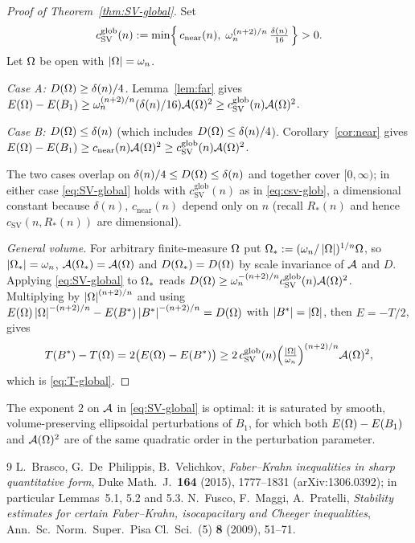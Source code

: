 \begin{proof}[Proof of Theorem~\ref{thm:SV-global}]
Set
\begin{equation}\label{eq:csv-glob}
   c_{\mathrm{SV}}^{\mathrm{glob}}(n)
   :=\min\Bigl\{\,c_{\mathrm{near}}(n),\;
   \omega_n^{(n+2)/n}\,\tfrac{\delta(n)}{16}\,\Bigr\}>0 .
\end{equation}
Let $\Omega$ be open with $\left|\Omega\right|=\omega_n$.

\emph{Case A: $D(\Omega)\ge\delta(n)/4$.} Lemma~\ref{lem:far} gives
$E(\Omega)-E(B_1)\ge\omega_n^{(n+2)/n}(\delta(n)/16)\mathcal{A}(\Omega)^2
\ge c_{\mathrm{SV}}^{\mathrm{glob}}(n)\mathcal{A}(\Omega)^2$.

\emph{Case B: $D(\Omega)\le\delta(n)$} (which includes
$D(\Omega)\le\delta(n)/4$). Corollary~\ref{cor:near} gives
$E(\Omega)-E(B_1)\ge c_{\mathrm{near}}(n)\mathcal{A}(\Omega)^2
\ge c_{\mathrm{SV}}^{\mathrm{glob}}(n)\mathcal{A}(\Omega)^2$.

The two cases overlap on $\delta(n)/4\le D(\Omega)\le\delta(n)$ and together
cover $[0,\infty)$; in either case \eqref{eq:SV-global} holds with
$c_{\mathrm{SV}}^{\mathrm{glob}}(n)$ as in \eqref{eq:csv-glob}, a
dimensional constant because $\delta(n)$, $c_{\mathrm{near}}(n)$ depend
only on $n$ (recall $R_*(n)$ and hence $c_{\mathrm{SV}}(n,R_*(n))$ are
dimensional).

\emph{General volume.} For arbitrary finite-measure $\Omega$ put
$\Omega_*:=(\omega_n/\left|\Omega\right|)^{1/n}\Omega$, so $\left|\Omega_*\right|=\omega_n$,
$\mathcal{A}(\Omega_*)=\mathcal{A}(\Omega)$ and $D(\Omega_*)=D(\Omega)$ by scale invariance of
$\mathcal{A}$ and $D$. Applying \eqref{eq:SV-global} to $\Omega_*$ reads
$D(\Omega)\ge\omega_n^{-(n+2)/n}c_{\mathrm{SV}}^{\mathrm{glob}}(n)\mathcal{A}(\Omega)^2$.
Multiplying by $\left|\Omega\right|^{(n+2)/n}$ and using
$E(\Omega)\left|\Omega\right|^{-(n+2)/n}-E(B^*)\left|B^*\right|^{-(n+2)/n}=D(\Omega)$ with
$\left|B^*\right|=\left|\Omega\right|$, then $E=-T/2$, gives
\[
   T(B^*)-T(\Omega)=2\bigl(E(\Omega)-E(B^*)\bigr)
   \ge2\,c_{\mathrm{SV}}^{\mathrm{glob}}(n)
   \Bigl(\tfrac{\left|\Omega\right|}{\omega_n}\Bigr)^{(n+2)/n}\mathcal{A}(\Omega)^2,
\]
which is \eqref{eq:T-global}.
\end{proof}

\begin{remark}
The exponent $2$ on $\mathcal{A}$ in \eqref{eq:SV-global} is optimal: it is
saturated by smooth, volume-preserving ellipsoidal perturbations of
$B_1$, for which both $E(\Omega)-E(B_1)$ and $\mathcal{A}(\Omega)^2$ are of the same
quadratic order in the perturbation parameter.
\end{remark}

\begin{thebibliography}{9}
 L.~Brasco, G.~De~Philippis, B.~Velichkov,
\emph{Faber--Krahn inequalities in sharp quantitative form},
Duke Math.\ J.\ \textbf{164} (2015), 1777--1831 (arXiv:1306.0392);
in particular Lemmas~5.1, 5.2 and 5.3.
 N.~Fusco, F.~Maggi, A.~Pratelli,
\emph{Stability estimates for certain Faber--Krahn, isocapacitary and
Cheeger inequalities},
Ann.\ Sc.\ Norm.\ Super.\ Pisa Cl.\ Sci.\ (5) \textbf{8} (2009), 51--71.
\end{thebibliography}


